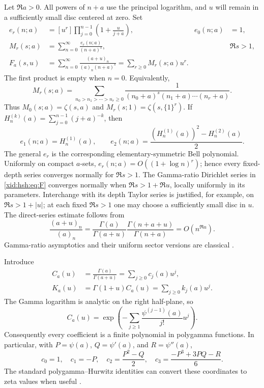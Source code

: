 Let $\Re a>0$. All powers of $n+a$ use the principal logarithm, and $u$
will remain in a sufficiently small disc centered at zero. Set
\begin{align}
 e_r(n;a)&=[u^r]\prod_{j=0}^{n-1}\left(1+\frac{u}{j+a}\right),
       &e_0(n;a)&=1,\label{xid:hsh:eq:er}\\
 M_r(s;a)&=\sum_{n=0}^{\infty}\frac{e_r(n;a)}{(n+a)^s},
       &&\Re s>1,\label{xid:hsh:eq:Mr}\\
 F_a(s,u)&=\sum_{n=0}^{\infty}
       \frac{(a+u)_n}{(a)_n(n+a)^s}
       =\sum_{r\ge0}M_r(s;a)u^r.
       \label{xid:hsh:eq:F}
\end{align}
The first product is empty when $n=0$. Equivalently,
\[
 M_r(s;a)=\sum_{n_0>n_1>\cdots>n_r\ge0}
       \frac{1}{(n_0+a)^s(n_1+a)\cdots(n_r+a)}.
\]
Thus $M_0(s;a)=\zeta(s,a)$ and $M_r(s;1)=\zeta(s,\{1\}^r)$.
If $H_n^{(k)}(a)=\sum_{j=0}^{n-1}(j+a)^{-k}$, then
\[
 e_1(n;a)=H_n^{(1)}(a),\qquad
 e_2(n;a)=\frac{(H_n^{(1)}(a))^2-H_n^{(2)}(a)}2.
\]
The general $e_r$ is the corresponding elementary-symmetric Bell
polynomial. Uniformly on compact $a$-sets,
$e_r(n;a)=O((1+\log n)^r)$; hence every fixed-depth series converges
normally for $\Re s>1$. The Gamma-ratio Dirichlet series in \eqref{xid:hsh:eq:F} converges normally
when $\Re s>1+\Re u$, locally uniformly in its parameters. Interchange
with its depth Taylor series is justified, for example, on
$\Re s>1+|u|$; at each fixed $\Re s>1$ one may choose a sufficiently
small disc in $u$. The direct-series estimate follows from
\[
 \frac{(a+u)_n}{(a)_n}
 =\frac{\Gamma(a)}{\Gamma(a+u)}
    \frac{\Gamma(n+a+u)}{\Gamma(n+a)}
 =O(n^{\Re u}).
\]
Gamma-ratio asymptotics and their uniform sector versions are classical
\cite{hsh:DLMFGamma}.

Introduce
\begin{align}
 C_a(u)&=\frac{\Gamma(a)}{\Gamma(a+u)}
        =\sum_{j\ge0}c_j(a)u^j,\label{xid:hsh:eq:Ca}\\
 K_a(u)&=\Gamma(1+u)C_a(u)
        =\sum_{j\ge0}k_j(a)u^j.\label{xid:hsh:eq:Ka}
\end{align}
The Gamma logarithm is analytic on the right half-plane, so
\begin{equation}\label{xid:hsh:eq:Cexp}
 C_a(u)=\exp\left(-\sum_{j\ge1}
                \frac{\psi^{(j-1)}(a)}{j!}u^j\right).
\end{equation}
Consequently every coefficient is a finite polynomial in polygamma
functions. In particular, with $P=\psi(a)$, $Q=\psi'(a)$, and
$R=\psi''(a)$,
\[
 c_0=1,\quad c_1=-P,\quad c_2=\frac{P^2-Q}{2},\quad
 c_3=\frac{-P^3+3PQ-R}{6}.
\]
The standard polygamma--Hurwitz identities can convert these coordinates
to zeta values when useful \cite{hsh:DLMFPolygamma,DLMFhurwitz}.

